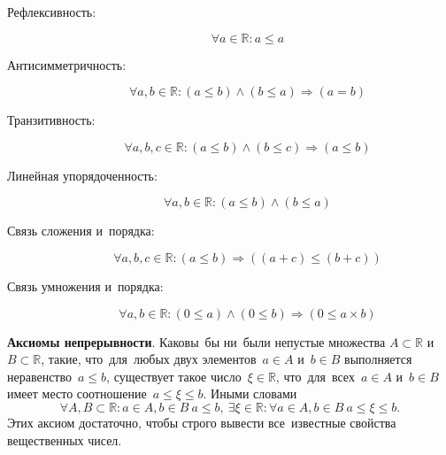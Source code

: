 \documentclass[]{scrartcl}
\begin{document}
\begin{description}
	\begin{description}
		\item[Рефлексивность:]
		\begin{equation}\label{eq:real-numbers-reflexivity}
		\forall a \in \mathbb{R}: a \leq a
		\end{equation}
		\item[Антисимметричность:]
		\begin{equation}\label{eq:real-numbers-anti-symmetry}
		\forall a,b \in \mathbb{R}: (a \leq b) \wedge (b \leq a) \Rightarrow (a = b) 
		\end{equation}
		\item[Транзитивность:]
		\begin{equation}\label{eq:real-numbers-transitivity}
		\forall a,b,c \in \mathbb{R}: (a \leq b) \wedge (b \leq c) \Rightarrow (a \leq b)
		\end{equation}
		\item[Линейная упорядоченность:]
		\begin{equation}\label{eq:real-numbers-linear-ordering}
		\forall a,b \in \mathbb{R}: (a \leq b) \wedge (b \leq a)    
		\end{equation}
		\item[Связь сложения и~порядка:]
		\begin{equation}\label{eq:real-numbers-relation-of-addition-and-order}
		\forall a,b,c \in \mathbb{R}: (a \leq b) \Rightarrow ((a+c) \leq (b+c))
		\end{equation}
		\item[Связь умножения и~порядка:]
		\begin{equation}\label{eq:real-numbers-relation-of-multiplication-and-order}
		\forall a,b \in \mathbb{R}: (0 \leq a) \wedge (0 \leq b) \Rightarrow (0 \leq a \times b)
		\end{equation}
	\end{description}
	\textbf{Аксиомы непрерывности}. Каковы~бы ни~были непустые множества ${\displaystyle A\subset \mathbb {R} }$ и~${\displaystyle B\subset \mathbb {R} }$, такие, что~для~любых двух элементов~${\displaystyle a\in A}$ и~${\displaystyle b\in B}$ выполняется неравенство~${\displaystyle a\leqslant b}$, существует такое число~${\displaystyle \xi \in \mathbb {R} }$, что~для~всех~${\displaystyle a\in A}$ и~${\displaystyle b\in B}$ имеет место соотношение~${\displaystyle a\leqslant \xi \leqslant b}$. Иными словами
	\begin{equation}\label{eq:real-numbers-continuity-axiom}
	\forall A,B \subset \mathbb{R}: a \in A, b \in B\ a \leqslant b,\ \exists \xi \in \mathbb{R}: \forall a \in A, b \in B\ a\leqslant \xi \leqslant b.
	\end{equation}
	Этих аксиом достаточно, чтобы строго вывести все~известные свойства вещественных чисел.
	

\end{description}
\end{document}
